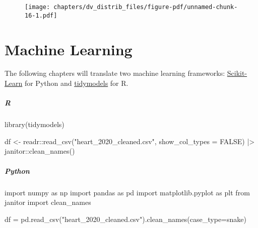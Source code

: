 \documentclass[
  letterpaper,
  DIV=11,
  numbers=noendperiod]{scrreprt}
\newenvironment{Shaded}{\begin{snugshade}}{\end{snugshade}}
\newcommand{\AttributeTok}[1]{\textcolor[rgb]{0.40,0.46,0.14}{#1}}
\newcommand{\ConstantTok}[1]{\textcolor[rgb]{0.56,0.35,0.01}{#1}}
\newcommand{\FunctionTok}[1]{\textcolor[rgb]{0.28,0.35,0.67}{#1}}
\newcommand{\ImportTok}[1]{\textcolor[rgb]{0.00,0.46,0.62}{#1}}
\newcommand{\NormalTok}[1]{\textcolor[rgb]{0.00,0.46,0.62}{#1}}
\newcommand{\OperatorTok}[1]{\textcolor[rgb]{0.37,0.37,0.37}{#1}}
\newcommand{\OtherTok}[1]{\textcolor[rgb]{0.00,0.46,0.62}{#1}}
\newcommand{\SpecialCharTok}[1]{\textcolor[rgb]{0.37,0.37,0.37}{#1}}
\newcommand{\StringTok}[1]{\textcolor[rgb]{0.13,0.47,0.30}{#1}}
\begin{document}
\begin{figure}[H]

{\centering \texttt{[image: chapters/dv\_distrib\_files/figure-pdf/unnamed-chunk-16-1.pdf]}

}

\end{figure}

\part{Machine Learning}

The following chapters will translate two machine learning frameworks:
\href{https://scikit-learn.org/stable/}{Scikit-Learn} for Python and
\href{https://www.tidymodels.org/}{tidymodels} for R.

\hypertarget{r-50}{%
\subsubsection*{R}\label{r-50}}

\begin{Shaded}
\begin{Highlighting}[]
\FunctionTok{library}\NormalTok{(tidymodels)}

\NormalTok{df }\OtherTok{\textless{}{-}}\NormalTok{ readr}\SpecialCharTok{::}\FunctionTok{read\_csv}\NormalTok{(}\StringTok{"heart\_2020\_cleaned.csv"}\NormalTok{, }\AttributeTok{show\_col\_types =} \ConstantTok{FALSE}\NormalTok{) }\SpecialCharTok{|\textgreater{}} 
\NormalTok{    janitor}\SpecialCharTok{::}\FunctionTok{clean\_names}\NormalTok{()}
\end{Highlighting}
\end{Shaded}

\hypertarget{python-50}{%
\subsubsection*{Python}\label{python-50}}

\begin{Shaded}
\begin{Highlighting}[]
\ImportTok{import}\NormalTok{ numpy }\ImportTok{as}\NormalTok{ np}
\ImportTok{import}\NormalTok{ pandas }\ImportTok{as}\NormalTok{ pd}
\ImportTok{import}\NormalTok{ matplotlib.pyplot }\ImportTok{as}\NormalTok{ plt}
\ImportTok{from}\NormalTok{ janitor }\ImportTok{import}\NormalTok{ clean\_names}

\NormalTok{df }\OperatorTok{=}\NormalTok{ pd.read\_csv(}\StringTok{"heart\_2020\_cleaned.csv"}\NormalTok{).clean\_names(case\_type}\OperatorTok{=}\StringTok{\textquotesingle{}snake\textquotesingle{}}\NormalTok{)}
\end{Highlighting}
\end{Shaded}
\end{document}

